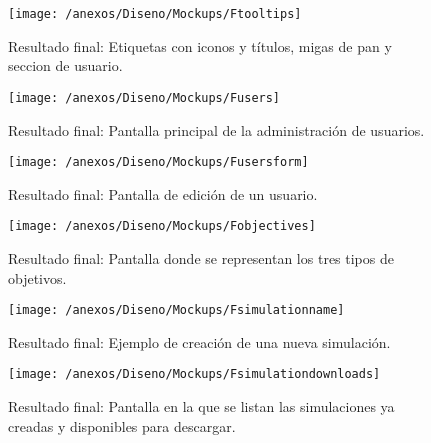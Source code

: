 \begin{figure}[h]
	\centering
	\texttt{[image: /anexos/Diseno/Mockups/Ftooltips]}
	\caption{Resultado final: Etiquetas con iconos y títulos, migas de pan y seccion de usuario.}
	\label{img:Ftooltips}
\end{figure}

\begin{figure}[h]
	\centering
	\texttt{[image: /anexos/Diseno/Mockups/Fusers]}
	\caption{Resultado final: Pantalla principal de la administración de usuarios.}
	\label{img:Fusers}
\end{figure}

\begin{figure}[h]
	\centering
	\texttt{[image: /anexos/Diseno/Mockups/Fusersform]}
	\caption{Resultado final: Pantalla de edición de un usuario.}
	\label{img:Fusersform}
\end{figure}

\begin{figure}[h]
	\centering
	\texttt{[image: /anexos/Diseno/Mockups/Fobjectives]}
	\caption{Resultado final: Pantalla donde se representan los tres tipos de objetivos.}
	\label{img:Fobjectives}
\end{figure}

\begin{figure}[h]
	\centering
	\texttt{[image: /anexos/Diseno/Mockups/Fsimulationname]}
	\caption{Resultado final: Ejemplo de creación de una nueva simulación.}
	\label{img:Fsimulationname}
\end{figure}

\begin{figure}[h]
	\centering
	\texttt{[image: /anexos/Diseno/Mockups/Fsimulationdownloads]}
	\caption{Resultado final: Pantalla en la que se listan las simulaciones ya creadas y disponibles para descargar.}
	\label{img:Fsimulationdownloads}
\end{figure}